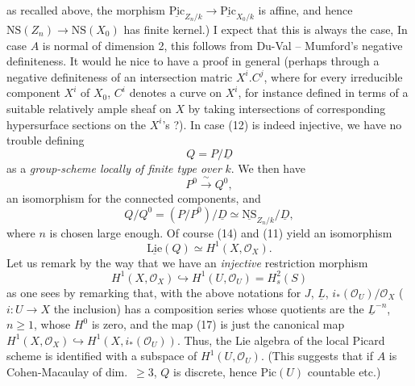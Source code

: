 \documentclass[11pt,a4paper]{article}
\begin{document}
as recalled above, the morphism
$\underline{\mathrm{Pic}}_{Z_n/k} \to \underline{\mathrm{Pic}}_{X_0/k}$ is
affine, and hence $\mathrm{NS}(Z_n) \to \mathrm{NS}(X_0)$ has finite kernel.)
I expect that this is always the case, \struck{\ill{}} In case $A$ is normal
of dimension 2, this follows from Du-Val -- Mumford's negative definiteness.
It would he nice to have a proof in general (perhaps through a negative
definiteness of an intersection matric $X^i . C^j$, where for every
irreducible component $X^i$ of $X_0$, $C^i$ denotes a  curve on
$X^i$, for instance defined in terms of a suitable relatively ample sheaf on
$X$ by taking intersections of corresponding hypersurface sections on the
$X^i$'s ?). In case (12) is indeed injective, we have no trouble defining
\begin{equation*}
\tag{13} Q = P/\underline{D}
\end{equation*}
as a \emph{group-scheme locally of finite type over} $k$. We then have
\begin{equation*}
\tag{14} P^0 \xrightarrow{\ \sim\ } Q^0 ,
\end{equation*}
an isomorphism for the connected components, and
\begin{equation*}
\tag{15} Q/Q^0 = (P/P^0)/\underline{D} \simeq \underline{\mathrm{NS}}_{Z_n/k} / \underline{D} ,
\end{equation*}
where $n$ is chosen large enough. Of course (14) and (11) yield an isomorphism
\begin{equation*}
\tag{16} \underline{\mathrm{Lie}}(Q) \simeq H^1(X, \mathcal{O}_X) .
\end{equation*}
Let us remark by the way that we have an \emph{injective} restriction morphism
\begin{equation*}
\tag{17} H^1(X, \mathcal{O}_X) \hookrightarrow H^1(U, \mathcal{O}_U) = H^2_s(S)
\end{equation*}
as one sees by remarking that, with the above notations for $J$,
$\underline{L}$,  $i_*(\mathcal{O}_U)/\mathcal{O}_X$
($i \colon U \to X$ the inclusion) has a composition series whose quotients
are the $\underline{L}^{-n}$, $n \geq 1$, whose $H^0$ is zero, and the map
(17) is just the canonical map
$H^1(X, \mathcal{O}_X) \hookrightarrow H^1(X, i_*(\mathcal{O}_U))$.
Thus, the Lie algebra of the local Picard scheme is identified with a subspace
of $H^1(U, \mathcal{O}_U)$. (This suggests that if $A$ is Cohen-Macaulay of
dim.~$\geq 3$, $Q$ is discrete, hence $\mathrm{Pic}(U)$ countable etc.)
\end{document}

